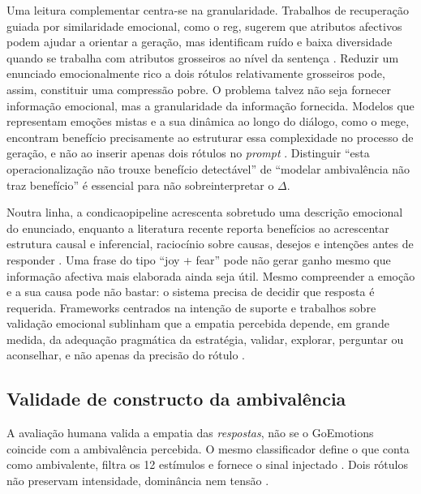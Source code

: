 Uma leitura complementar centra-se na granularidade. Trabalhos de recuperação guiada por similaridade emocional, como o \gls{reg}, sugerem que atributos afectivos podem ajudar a orientar a geração, mas identificam ruído e baixa diversidade quando se trabalha com atributos grosseiros ao nível da sentença \parencite{Wang2026REG}. Reduzir um enunciado emocionalmente rico a dois rótulos relativamente grosseiros pode, assim, constituir uma compressão pobre. O problema talvez não seja fornecer informação emocional, mas a granularidade da informação fornecida. Modelos que representam emoções mistas e a sua dinâmica ao longo do diálogo, como o \gls{mege}, encontram benefício precisamente ao estruturar essa complexidade no processo de geração, e não ao inserir apenas dois rótulos no \textit{prompt} \parencite{Zhao2026MEGE}. Distinguir ``esta operacionalização não trouxe benefício detectável'' de ``modelar ambivalência não traz benefício'' é essencial para não sobreinterpretar o \(\Delta\).

Noutra linha, a \gls{condicaopipeline} acrescenta sobretudo uma descrição emocional do enunciado, enquanto a literatura recente reporta benefícios ao acrescentar estrutura causal e inferencial, raciocínio sobre causas, desejos e intenções antes de responder \parencite{Fu2023ReasoningBeforeResponding, Chen2024CauseAware, He2025ECC}. Uma frase do tipo ``joy + fear'' pode não gerar ganho mesmo que informação afectiva mais elaborada ainda seja útil. Mesmo compreender a emoção e a sua causa pode não bastar: o sistema precisa de decidir que resposta é requerida. Frameworks centrados na intenção de suporte e trabalhos sobre validação emocional sublinham que a empatia percebida depende, em grande medida, da adequação pragmática da estratégia, validar, explorar, perguntar ou aconselhar, e não apenas da precisão do rótulo \parencite{Zhang2025IntentionESC, Son2026EmotionalValidation, Wan2025EmoDynamiX}.

\subsection{Validade de constructo da ambivalência}
\label{subsec:disc_constructo}

A avaliação humana valida a empatia das \textit{respostas}, não se o GoEmotions coincide com a ambivalência percebida. O mesmo classificador define o que conta como ambivalente, filtra os 12 estímulos e fornece o sinal injectado \parencite{Demszky2020GoEmotions}. Dois rótulos não preservam intensidade, dominância nem tensão \parencite{Singh2026MultiEmotionIntensity}.

